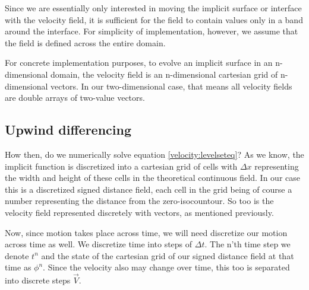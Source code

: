 Since we are essentially only interested in moving the implicit surface or interface with the velocity field, it is sufficient for the field to contain values only in a band around the interface. For simplicity of implementation, however, we assume that the field is defined across the entire domain.

For concrete implementation purposes, to evolve an implicit surface in an n-dimensional domain, the velocity field is an n-dimensional cartesian grid of n-dimensional vectors. In our two-dimensional case, that means all velocity fields are double arrays of two-value vectors.

\subsection{Upwind differencing}
How then, do we numerically solve equation \ref{velocity:levelseteq}? As we know, the implicit function is discretized into a cartesian grid of cells with $\Delta x$ representing the width and height of these cells in the theoretical continuous field. In our case this is a discretized signed distance field, each cell in the grid being of course a number representing the distance from the zero-isocountour. So too is the velocity field represented discretely with vectors, as mentioned previously.

Now, since motion takes place across time, we will need discretize our motion across time as well. We discretize time into steps of $\Delta t$. The n'th time step we denote $t^n$ and the state of the cartesian grid of our signed distance field at that time as $\phi^n$. Since the velocity also may change over time, this too is separated into discrete steps $\vec{V}$.

